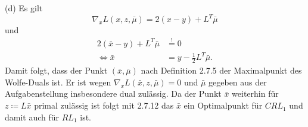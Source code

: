 \documentclass[ngerman, a4paper,12pt]{article}
\begin{document}
\par
(d) Es gilt 
\begin{equation*}
	\nabla_x L(x, z, \bar{\mu}) = 2(x-y)+ L^T\bar{\mu}
\end{equation*}
und
\begin{equation*}
	\begin{split}
		2( \bar{x} - y) + L^T\bar{\mu} &\stackrel{!}{=} 0 \\
		\Leftrightarrow \bar{x} &= y - \frac{1}{2}L^T\bar{\mu}.
	\end{split}
\end{equation*}
Damit folgt, dass der Punkt $(\bar{x}, \bar{\mu})$ nach Definition 2.7.5 der Maximalpunkt des Wolfe-Duals ist. Er ist wegen $\nabla _x L(\bar{x},z, \bar{\mu}) = 0$ und $\bar{\mu}$ gegeben aus der Aufgabenstellung insbesondere dual zulässig. Da der Punkt $\bar{x}$ weiterhin für $z \coloneqq L\bar{x}$ primal zulässig ist folgt mit 2.7.12 das $\bar{x}$ ein Optimalpunkt für $CRL_1$ und damit auch für $RL_1$ ist.


\end{document}
